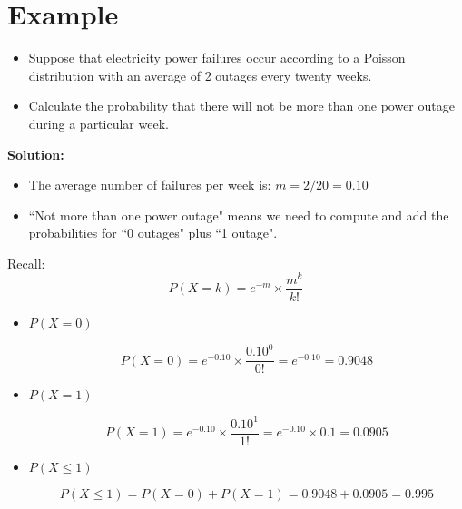 \documentclass[a4paper,12pt]{article}
\begin{document}
\section*{Example}
\begin{itemize}
	
	\item Suppose that electricity power failures occur according to a Poisson distribution
	with an average of 2 outages every twenty weeks. \item Calculate the probability that there will
	not be more than one power outage during a particular week.
\end{itemize}

\noindent \textbf{Solution:}

\begin{itemize}
	\item The average number of failures per week is: $m = 2/20 = 0.10$
	
	\item ``Not more than one  power outage" means we need to compute and add the probabilities for ``0 outages" plus ``1 outage".
\end{itemize}



Recall: \[P(X = k) = e^{-m}\times \frac{m^k}{k!}\]


\begin{itemize}
	
	\item $P(X = 0)$
	
	\[P(X = 0) = e^{-0.10} \times \frac{0.10^0}{0!} = e^{-0.10} = 0.9048\]
	
	
	\item $P(X = 1)$
	
	\[P(X = 1) = e^{-0.10}\times \frac{0.10^1}{1!} = e^{-0.10}\times 0.1 = 0.0905\]
	
	\item $P(X \leq 1)$
	
	\[P(X \leq 1) = P(X = 0) + P(X = 1) = 0.9048 + 0.0905 = 0.995\]
	
\end{itemize}
\end{document}
